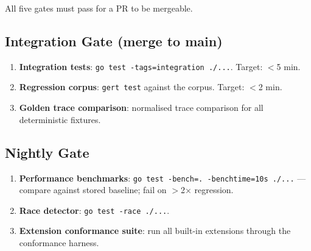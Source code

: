 All five gates must pass for a PR to be mergeable.

\subsection{Integration Gate (merge to main)}

\begin{enumerate}[label=\arabic*.]
  \item \textbf{Integration tests}: \texttt{go test -tags=integration ./...}. Target: $<$5 min.
  \item \textbf{Regression corpus}: \texttt{gert test} against the corpus. Target: $<$2 min.
  \item \textbf{Golden trace comparison}: normalised trace comparison for all deterministic fixtures.
\end{enumerate}

\subsection{Nightly Gate}

\begin{enumerate}[label=\arabic*.]
  \item \textbf{Performance benchmarks}: \texttt{go test -bench=. -benchtime=10s ./...} — compare against stored baseline; fail on $>$2$\times$ regression.
  \item \textbf{Race detector}: \texttt{go test -race ./...}.
  \item \textbf{Extension conformance suite}: run all built-in extensions through the conformance harness.
\end{enumerate}

